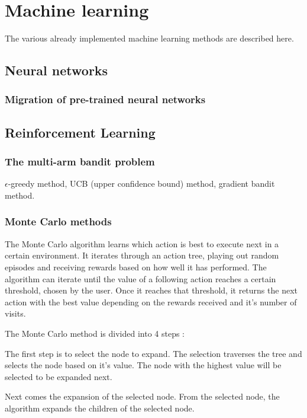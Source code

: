 \documentclass{book}
\begin{document}
\chapter{Machine learning}

The various already implemented machine learning methods are described here.

\section{Neural networks}

\subsection{Migration of pre-trained neural networks}


\section{Reinforcement Learning}

\subsection{The multi-arm bandit problem}

$\epsilon$-greedy method, UCB (upper confidence bound) method, gradient bandit method.

\subsection{Monte Carlo methods}

The Monte Carlo algorithm learns which action is best to execute next in a certain environment. It iterates through an action tree, playing out random episodes and receiving rewards based on how well it has performed. The algorithm can iterate until the value of a following action reaches a certain threshold, chosen by the user. Once it reaches that threshold, it returns the next action with the best value depending on the rewards received and it's number of visits.

The Monte Carlo method is divided into 4 steps :

The first step is to select the node to expand. The selection traverses the tree and selects the node based on it's value. The node with the highest value will be selected to be expanded next.

Next comes the expansion of the selected node. From the selected node, the algorithm expands the children of the selected node.
\end{document}
